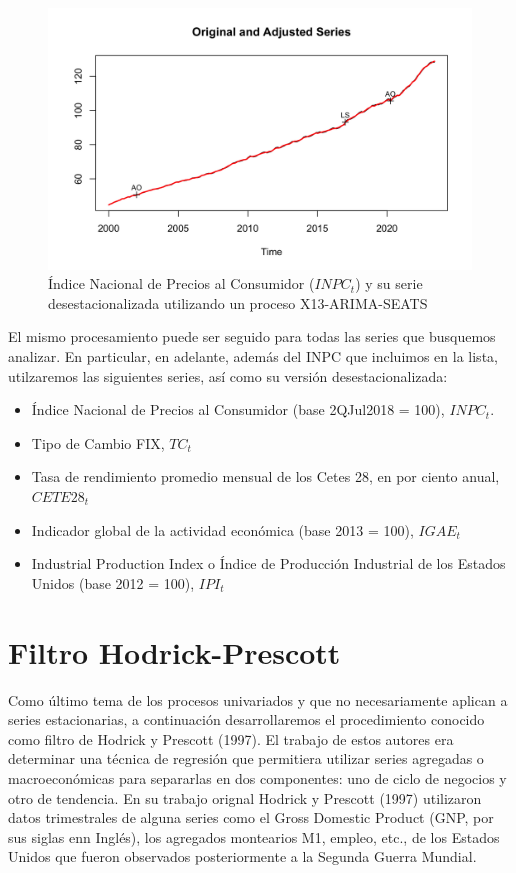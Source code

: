 \documentclass[
]{book}
\begin{document}
\begin{figure}

{\centering \includegraphics[width=0.95\linewidth]{Plots/G_INPC_Adj} 

}

\caption{Índice Nacional de Precios al Consumidor ($INPC_t$) y su serie desestacionalizada utilizando un proceso X13-ARIMA-SEATS}\label{fig:fig51}
\end{figure}

El mismo procesamiento puede ser seguido para todas las series que busquemos analizar. En particular, en adelante, además del INPC que incluimos en la lista, utilzaremos las siguientes series, así como su versión desestacionalizada:

\begin{itemize}
    \item Índice Nacional de Precios al Consumidor (base 2QJul2018 = 100), $INPC_t$.
    \item Tipo de Cambio FIX, $TC_t$
    \item Tasa de rendimiento promedio mensual de los Cetes 28, en por ciento anual, $CETE28_t$
    \item Indicador global de la actividad económica (base 2013 = 100), $IGAE_t$
    \item Industrial Production Index o Índice de Producción Industrial de los Estados Unidos (base 2012 = 100), $IPI_t$
\end{itemize}

\hypertarget{filtro-hodrick-prescott}{%
\section{Filtro Hodrick-Prescott}\label{filtro-hodrick-prescott}}

Como último tema de los procesos univariados y que no necesariamente aplican a series estacionarias, a continuación desarrollaremos el procedimiento conocido como filtro de Hodrick y Prescott (1997). El trabajo de estos autores era determinar una técnica de regresión que permitiera utilizar series agregadas o macroeconómicas para separarlas en dos componentes: uno de ciclo de negocios y otro de tendencia. En su trabajo orignal Hodrick y Prescott (1997) utilizaron datos trimestrales de alguna series como el Gross Domestic Product (GNP, por sus siglas enn Inglés), los agregados montearios M1, empleo, etc., de los Estados Unidos que fueron observados posteriormente a la Segunda Guerra Mundial.
\end{document}
